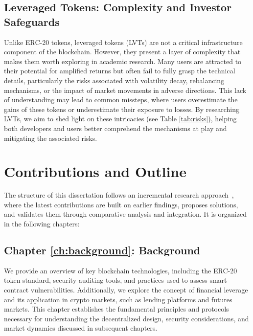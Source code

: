\subsection{Leveraged Tokens: Complexity and Investor Safeguards}
Unlike ERC-20 tokens, leveraged tokens (LVTs) are not a critical infrastructure component of the blockchain. However, they present a layer of complexity that makes them worth exploring in academic research. Many users are attracted to their potential for amplified returns but often fail to fully grasp the technical details, particularly the risks associated with volatility decay, rebalancing mechanisms, or the impact of market movements in adverse directions. This lack of understanding may lead to common missteps, where users overestimate the gains of these tokens or underestimate their exposure to losses. By researching LVTs, we aim to shed light on these intricacies (see Table \ref{tab:risks}), helping both developers and users better comprehend the mechanisms at play and mitigating the associated risks.


\section{Contributions and Outline} 
The structure of this dissertation follows an incremental research approach~\cite{Incremental_Research}, where the latest contributions are built on earlier findings, proposes solutions, and validates them through comparative analysis and integration. It is organized in the following chapters:

\subsection{Chapter \ref{ch:background}: Background} We provide an overview of key blockchain technologies, including the ERC-20 token standard, security auditing tools, and practices used to assess smart contract vulnerabilities. Additionally, we explore the concept of financial leverage and its application in crypto markets, such as lending platforms and futures markets. This chapter establishes the fundamental principles and protocols necessary for understanding the decentralized design, security considerations, and market dynamics discussed in subsequent chapters.

